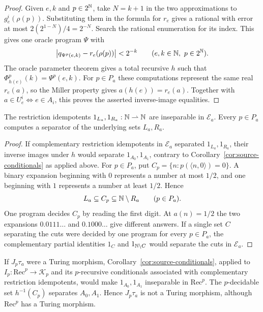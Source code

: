 \begin{proof}
Given $e,k$ and $p\in2^{\mathbb N}$, take $N=k+1$ in the two
approximations to $g_e^i(\rho(p))$. Substituting them in the formula for
$r_e$ gives a rational with error at most $2(2^{1-N})/4=2^{-N}$.
Search the rational enumeration for its index. This gives one oracle
program $\Psi$ with
\[
 \bigl|q_{\Psi^p(e,k)}-r_e(\rho(p))\bigr|<2^{-k}
 \qquad(e,k\in\mathbb N,\ p\in2^{\mathbb N}).
\]
The oracle parameter theorem gives a total recursive $h$ such that
$\Phi_{h(e)}^p(k)=\Psi^p(e,k)$. For $p\in P_a$ these computations
represent the same real $r_e(a)$, so the Miller property gives
$a(h(e))=r_e(a)$.
Together with $a\in U_e^i\Longleftrightarrow e\in A_i$, this proves
the asserted inverse-image equalities.
\end{proof}

\begin{corollary}\label{cor:miller-cuts-inseparable}
The restriction idempotents $1_{L_a},1_{R_a}:\mathbb N\rightharpoonup\mathbb N$ are inseparable in
$\mathcal E_a$. Every $p\in P_a$ computes a separator
of the underlying sets $L_a,R_a$.
\end{corollary}
\begin{proof}
If complementary restriction idempotents in $\mathcal E_a$ separated
$1_{L_a},1_{R_a}$, their inverse images under $h$ would separate
$1_{A_0},1_{A_1}$, contrary to
Corollary~\ref{cor:source-conditionals} as applied above.
For $p\in P_a$, put $C_p=\{n:p(\langle n,0\rangle)=0\}$. A binary
expansion beginning with $0$ represents a number at most $1/2$,
and one beginning with $1$ represents a number at least $1/2$. Hence
\[
 L_a\subseteq C_p\subseteq\mathbb N\setminus R_a
 \qquad(p\in P_a).
\]
One program decides $C_p$ by reading the first digit. At $a(n)=1/2$
the two expansions $0.0111\ldots$ and $0.1000\ldots$ give different
answers. If a single set $C$ separating the cuts were decided by one
program for every $p\in P_a$, the complementary partial identities
$1_C$ and $1_{\mathbb N\setminus C}$ would separate the cuts in $\mathcal E_a$.

\end{proof}

If $J_p\tau_a$ were a Turing morphism, Corollary~\ref{cor:source-conditionals},
applied to $I_p:\mathrm{Rec}^{p}\to\mathcal K_p$ and its
$p$-recursive conditionals associated with complementary restriction
idempotents, would make $1_{A_0},1_{A_1}$ inseparable in
$\mathrm{Rec}^{p}$. The $p$-decidable set $h^{-1}(C_p)$ separates
$A_0,A_1$. Hence $J_p\tau_a$ is not a Turing
morphism, although $\mathrm{Rec}^{p}$ has a Turing morphism.


